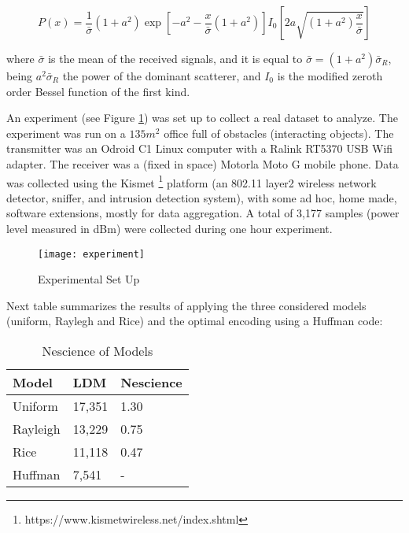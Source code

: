 \[
P(x)=\frac{1}{\bar{\sigma}}\left(1+a^{2}\right)\exp\left[-a^{2}-\frac{x}{\bar{\sigma}}\left(1+a^{2}\right)\right]I_{0}\left[2a\sqrt{\left(1+a^{2}\right)\frac{x}{\bar{\sigma}}}\right]
\]


where $\bar{\sigma}$ is the mean of the received signals, and it is equal to $\bar{\sigma}=\left(1+a^{2}\right)\bar{\sigma}_{R}$, being $a^{2}\bar{\sigma}_{R}$ the power of the dominant scatterer, and $I_{0}$ is the modified zeroth order Bessel function of the first kind.

An experiment (see Figure \ref{fig:Experimental-Set-Up}) was set up to collect a real dataset to analyze. The experiment was run on a $135 m^2$ office full of obstacles (interacting objects). The transmitter was an Odroid C1 Linux computer with a Ralink RT5370 USB Wifi adapter. The receiver was a (fixed in space) Motorla Moto G mobile phone. Data was collected using the Kismet \footnote{https://www.kismetwireless.net/index.shtml} platform (an 802.11 layer2 wireless network detector, sniffer, and intrusion detection system), with some ad hoc, home made, software extensions, mostly for data aggregation. A total of 3,177 samples (power level measured in dBm) were collected during one hour experiment.

\begin{figure}[h]
\centering\texttt{[image: experiment]}
\caption{\label{fig:Experimental-Set-Up}Experimental Set Up}
\end{figure}

Next table summarizes the results of applying the three considered models (uniform, Raylegh and Rice) and the optimal encoding using a Huffman code:

\begin{table}[h]
\centering
\begin{tabular}{l l l}
\toprule
\textbf{Model} & \textbf{LDM} & \textbf{Nescience} \\
\midrule
Uniform & 17,351 & 1.30 \\
Rayleigh & 13,229 & 0.75 \\
Rice & 11,118 & 0.47 \\
Huffman & 7,541 & - \\
\bottomrule
\end{tabular}
\caption{Nescience of Models}
\end{table}

